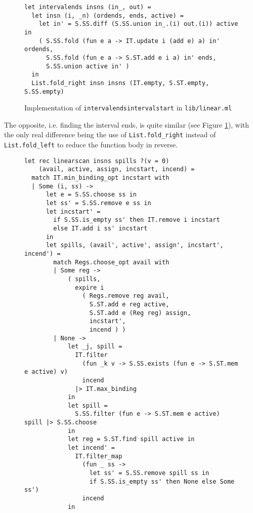\documentclass{article}
\begin{document}
\begin{figure}[H]
  \centering
   \begin{minipage}[b]{0.95\textwidth}
     \centering
     \begin{verbatim}
let intervalends insns (in_, out) =
  let insn (i, _n) (ordends, ends, active) =
    let in' = S.SS.diff (S.SS.union in_.(i) out.(i)) active in
    ( S.SS.fold (fun e a -> IT.update i (add e) a) in' ordends,
      S.SS.fold (fun e a -> S.ST.add e i a) in' ends,
      S.SS.union active in' )
  in
  List.fold_right insn insns (IT.empty, S.ST.empty, S.SS.empty)
     \end{verbatim}
     \caption{Implementation of \texttt{intervalendsintervalstart} in \texttt{lib/linear.ml}}\label{fig:intervalends.ml}
   \end{minipage}
\end{figure}


\noindent The opposite, i.e. finding the interval ends, is quite similar (see Figure \ref{fig:intervalends.ml}), with the only real difference being the use of \texttt{List.fold\_right} instead of \texttt{List.fold\_left} to reduce the function body in reverse.

\begin{figure}[H]
     \centering
     \begin{verbatim}
let rec linearscan insns spills ?(v = 0)
    (avail, active, assign, incstart, incend) =
  match IT.min_binding_opt incstart with
  | Some (i, ss) ->
      let e = S.SS.choose ss in
      let ss' = S.SS.remove e ss in
      let incstart' =
        if S.SS.is_empty ss' then IT.remove i incstart
        else IT.add i ss' incstart
      in
      let spills, (avail', active', assign', incstart', incend') =
        match Regs.choose_opt avail with
        | Some reg ->
            ( spills,
              expire i
                ( Regs.remove reg avail,
                  S.ST.add e reg active,
                  S.ST.add e (Reg reg) assign,
                  incstart',
                  incend ) )
        | None ->
            let _j, spill =
              IT.filter
                (fun _k v -> S.SS.exists (fun e -> S.ST.mem e active) v)
                incend
              |> IT.max_binding
            in
            let spill =
              S.SS.filter (fun e -> S.ST.mem e active) spill |> S.SS.choose
            in
            let reg = S.ST.find spill active in
            let incend' =
              IT.filter_map
                (fun _ ss ->
                  let ss' = S.SS.remove spill ss in
                  if S.SS.is_empty ss' then None else Some ss')
                incend
            in
     \end{verbatim}
\end{figure}
\end{document}
